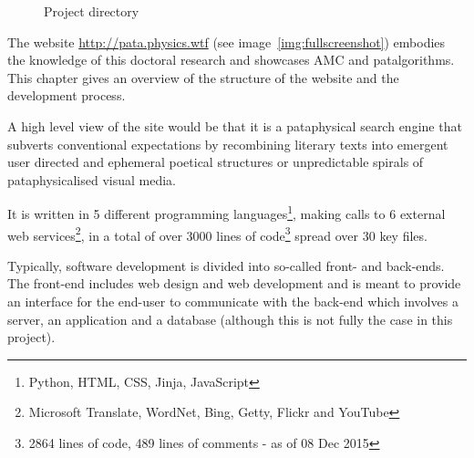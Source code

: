 \begin{figure}
  \centering
  \caption[Project directory]{Project directory}
  \label{fig:dir}
  \vspace{-2cm}
\end{figure}

The website \url{http://pata.physics.wtf} (see image~\ref{img:fullscreenshot}) embodies the knowledge of this doctoral research and showcases \acf{AMC} and patalgorithms. This chapter gives an overview of the structure of the website and the development process.

A high level view of the site would be that it is a pataphysical search engine that subverts conventional expectations by recombining literary texts into emergent user directed and ephemeral poetical structures or unpredictable spirals of pataphysicalised visual media. 

It is written in 5 different programming languages\footnote{Python, \acs{HTML}, \acs{CSS}, Jinja, JavaScript}, making calls to 6 external web services\footnote{Microsoft Translate, WordNet, Bing, Getty, Flickr and YouTube}, in a total of over \num{3000} lines of code\footnote{\num{2864} lines of code, \num{489} lines of comments - as of 08 Dec 2015} spread over 30 key files. 

Typically, software development is divided into so-called front- and back-ends. The front-end includes web design and web development and is meant to provide an interface for the end-user to communicate with the back-end which involves a server, an application and a database (although this is not fully the case in this project).

